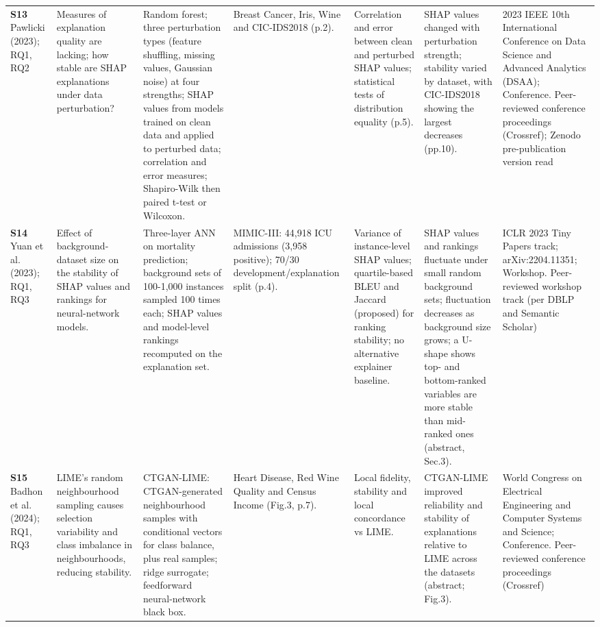 \begin{longtable}{@{}P{1.55cm}P{2.9cm}P{4.5cm}P{3.2cm}P{3.4cm}P{4.6cm}P{3.6cm}@{}}
\textbf{S13} \cite{S13} Pawlicki (2023); RQ1, RQ2 & Measures of explanation quality are lacking; how stable are SHAP explanations under data perturbation? & Random forest; three perturbation types (feature shuffling, missing values, Gaussian noise) at four strengths; SHAP values from models trained on clean data and applied to perturbed data; correlation and error measures; Shapiro-Wilk then paired t-test or Wilcoxon. & Breast Cancer, Iris, Wine and CIC-IDS2018 (p.2). & Correlation and error between clean and perturbed SHAP values; statistical tests of distribution equality (p.5). & SHAP values changed with perturbation strength; stability varied by dataset, with CIC-IDS2018 showing the largest decreases (pp.10). & 2023 IEEE 10th International Conference on Data Science and Advanced Analytics (DSAA); Conference. Peer-reviewed conference proceedings (Crossref); Zenodo pre-publication version read \\
\textbf{S14} \cite{S14} Yuan et al. (2023); RQ1, RQ3 & Effect of background-dataset size on the stability of SHAP values and rankings for neural-network models. & Three-layer ANN on mortality prediction; background sets of 100-1,000 instances sampled 100 times each; SHAP values and model-level rankings recomputed on the explanation set. & MIMIC-III: 44,918 ICU admissions (3,958 positive); 70/\allowbreak{}30 development/\allowbreak{}explanation split (p.4). & Variance of instance-level SHAP values; quartile-based BLEU and Jaccard (proposed) for ranking stability; no alternative explainer baseline. & SHAP values and rankings fluctuate under small random background sets; fluctuation decreases as background size grows; a U-shape shows top- and bottom-ranked variables are more stable than mid-ranked ones (abstract, Sec.3). & ICLR 2023 Tiny Papers track; arXiv:2204.11351; Workshop. Peer-reviewed workshop track (per DBLP and Semantic Scholar) \\
\textbf{S15} \cite{S15} Badhon et al. (2024); RQ1, RQ3 & LIME's random neighbourhood sampling causes selection variability and class imbalance in neighbourhoods, reducing stability. & CTGAN-LIME: CTGAN-generated neighbourhood samples with conditional vectors for class balance, plus real samples; ridge surrogate; feedforward neural-network black box. & Heart Disease, Red Wine Quality and Census Income (Fig.3, p.7). & Local fidelity, stability and local concordance vs LIME. & CTGAN-LIME improved reliability and stability of explanations relative to LIME across the datasets (abstract; Fig.3). & World Congress on Electrical Engineering and Computer Systems and Science; Conference. Peer-reviewed conference proceedings (Crossref) \\

\end{longtable}
